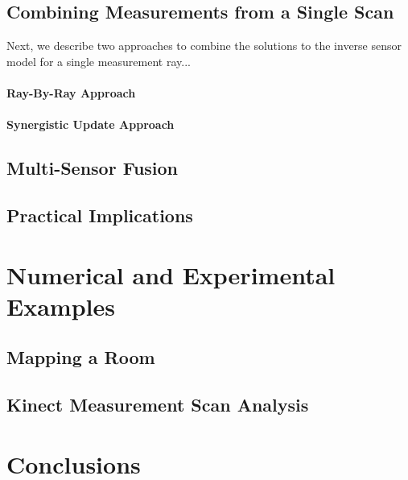 \subsection{Combining Measurements from a Single Scan}

Next, we describe two approaches to combine the solutions to the inverse sensor model for a single measurement ray...

\paragraph{Ray-By-Ray Approach}

\paragraph{Synergistic Update Approach}

\subsection{Multi-Sensor Fusion}

\subsection{Practical Implications}

\section{Numerical and Experimental Examples}

\subsection{Mapping a Room}

\subsection{Kinect Measurement Scan Analysis}


\section{Conclusions}

